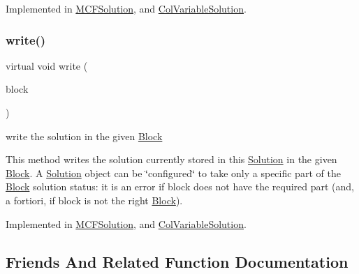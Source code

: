 Implemented in \mbox{\hyperlink{class_s_m_spp__di__unipi__it_1_1_m_c_f_solution_ac91491316467fa9925f2c8e8fc08f4c1}{M\+C\+F\+Solution}}, and \mbox{\hyperlink{class_s_m_spp__di__unipi__it_1_1_col_variable_solution_abf263a2361d4099d9fe7fd4cddc7f7ec}{Col\+Variable\+Solution}}.

\mbox{\label{class_s_m_spp__di__unipi__it_1_1_solution_a6ba3f1b8f44f35e6a56fc0795587f68a}} 
\subsubsection{\texorpdfstring{write()}{write()}}
{\footnotesize\ttfamily virtual void write (\begin{DoxyParamCaption}\item[{\mbox{\hyperlink{class_s_m_spp__di__unipi__it_1_1_block}{Block}} $\ast$const}]{block }\end{DoxyParamCaption})\hspace{0.3cm}{\ttfamily [pure virtual]}}



write the solution in the given \mbox{\hyperlink{class_s_m_spp__di__unipi__it_1_1_block}{Block}} 

This method writes the solution currently stored in this \mbox{\hyperlink{class_s_m_spp__di__unipi__it_1_1_solution}{Solution}} in the given \mbox{\hyperlink{class_s_m_spp__di__unipi__it_1_1_block}{Block}}. A \mbox{\hyperlink{class_s_m_spp__di__unipi__it_1_1_solution}{Solution}} object can be \char`\"{}configured\char`\"{} to take only a specific part of the \mbox{\hyperlink{class_s_m_spp__di__unipi__it_1_1_block}{Block}} solution status\+: it is an error if block does not have the required part (and, a fortiori, if block is not the right \mbox{\hyperlink{class_s_m_spp__di__unipi__it_1_1_block}{Block}}). 

Implemented in \mbox{\hyperlink{class_s_m_spp__di__unipi__it_1_1_m_c_f_solution_ad3aad23f258ee59d0c21f1fa6ecdc6fe}{M\+C\+F\+Solution}}, and \mbox{\hyperlink{class_s_m_spp__di__unipi__it_1_1_col_variable_solution_a99a9429b60ac714f7a4b5cbe4c0a96e4}{Col\+Variable\+Solution}}.



\subsection{Friends And Related Function Documentation}
\mbox{\label{class_s_m_spp__di__unipi__it_1_1_solution_a1963158e39c1643e92996ee932626aab}} 
